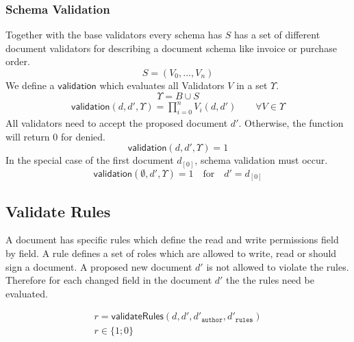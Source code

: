 \subsubsection{Schema Validation}
 Together with the base validators every schema has $S$  has a set of different document validators for describing a document schema like invoice or purchase order. 
\begin{equation}
     S = (V_0,...,V_n) 
\end{equation}
We define a $\mathsf{validation}$ which evaluates all Validators $V$ in a set $\Upsilon$.
\begin{equation}
     \Upsilon = B \cup S
\end{equation}
\begin{equation}
\begin{split}
   \mathsf{validation}(d,d',\Upsilon) =\prod_{i=0}^{n} V_i(d, d')  \qquad \forall V \in \Upsilon
    \end{split}
\end{equation}
All validators need to accept the proposed document $d'$. Otherwise, the function will return $0$ for denied.
\begin{equation}
  \mathsf{validation}(d,d',\Upsilon) = 1
\end{equation}
 In the special case of the first document $d_{[0]}$, schema validation must occur.
\begin{equation}
  \mathsf{validation}(\emptyset, d',\Upsilon) = 1 \quad \text{for} \quad  d' = d_{[0]}
\end{equation}

\subsection{Validate Rules}
A document has specific rules which define the read and write permissions field by field. A rule defines a set of roles which are allowed to write, read or should sign a document. A proposed new document $d'$ is not allowed to violate the rules. Therefore for each changed field in the document $d'$ the the rules need be evaluated.

\begin{equation}
 \begin{split}
  r = \mathsf{validateRules}(d,d',d'_{\mathtt{author}},d'_{\mathtt{rules}}) \\
  r \in \{1;0\}
 \end{split}
\end{equation}

